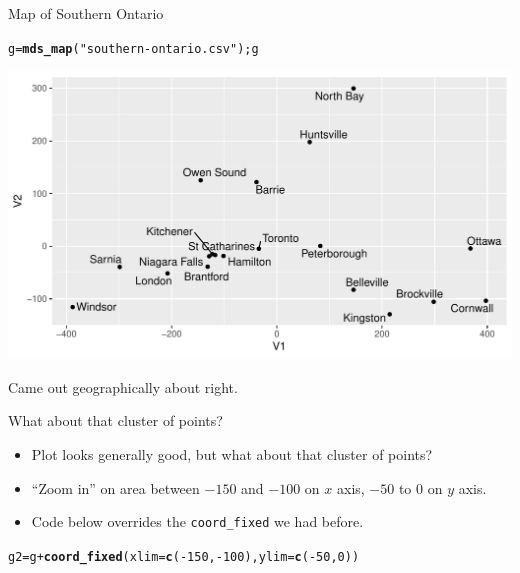 \documentclass[unknownkeysallowed]{beamer}\usepackage[]{graphicx}\usepackage[]{color}
\makeatletter
\def\maxwidth{ %
  \ifdim\Gin@nat@width>\linewidth
    \linewidth
  \else
    \Gin@nat@width
  \fi
}
\newcommand{\hlnum}[1]{\textcolor[rgb]{0.686,0.059,0.569}{#1}}%
\newcommand{\hlstr}[1]{\textcolor[rgb]{0.192,0.494,0.8}{#1}}%
\newcommand{\hlopt}[1]{\textcolor[rgb]{0,0,0}{#1}}%
\newcommand{\hlstd}[1]{\textcolor[rgb]{0.345,0.345,0.345}{#1}}%
\newcommand{\hlkwb}[1]{\textcolor[rgb]{0.69,0.353,0.396}{#1}}%
\newcommand{\hlkwc}[1]{\textcolor[rgb]{0.333,0.667,0.333}{#1}}%
\newcommand{\hlkwd}[1]{\textcolor[rgb]{0.737,0.353,0.396}{\textbf{#1}}}%
\newenvironment{kframe}{%
 \def\at@end@of@kframe{}%
 \ifinner\ifhmode%
  \def\at@end@of@kframe{\end{minipage}}%
  \begin{minipage}{\columnwidth}%
 \fi\fi%
 \def\FrameCommand##1{\hskip\@totalleftmargin \hskip-\fboxsep
 \colorbox{shadecolor}{##1}\hskip-\fboxsep
     \hskip-\linewidth \hskip-\@totalleftmargin \hskip\columnwidth}%
 \MakeFramed {\advance\hsize-\width
   \@totalleftmargin\z@ \linewidth\hsize
   \@setminipage}}%
 {\par\unskip\endMakeFramed%
 \at@end@of@kframe}
\newenvironment{knitrout}{}{} %
\makeatother
\begin{document}
\begin{frame}[fragile]{Map of Southern Ontario}
  
\begin{knitrout}
\color{fgcolor}\begin{kframe}
\begin{alltt}
\hlstd{g} \hlkwb{=} \hlkwd{mds_map}\hlstd{(}\hlstr{"southern-ontario.csv"}\hlstd{) ; g}
\end{alltt}
\end{kframe}
\includegraphics[width=\maxwidth]{figure/unnamed-chunk-408-1} 

\end{knitrout}

Came out geographically about right.
  
\end{frame}

\begin{frame}[fragile]{What about that cluster of points?}

  \begin{itemize}
  \item Plot looks generally good, but what about that cluster of points?
  \item ``Zoom in'' on area between $-150$ and $-100$ on $x$ axis, $-50$ to 0 on
$y$ axis.
\item Code below overrides the \texttt{coord\_fixed} we had before.
  \end{itemize}


\begin{knitrout}\small
{}\color{fgcolor}\begin{kframe}
\begin{alltt}
\hlstd{g2} \hlkwb{=} \hlstd{g} \hlopt{+} \hlkwd{coord_fixed}\hlstd{(}\hlkwc{xlim}\hlstd{=}\hlkwd{c}\hlstd{(}\hlopt{-}\hlnum{150}\hlstd{,}\hlopt{-}\hlnum{100}\hlstd{),}\hlkwc{ylim}\hlstd{=}\hlkwd{c}\hlstd{(}\hlopt{-}\hlnum{50}\hlstd{,}\hlnum{0}\hlstd{))}
\end{alltt}


{\ttfamily\noindent\itshape\color{messagecolor}{\#\# Coordinate system already present. Adding new coordinate system, which will replace the existing one.}}\end{kframe}
\end{knitrout}

  
\end{frame}
\end{document}
